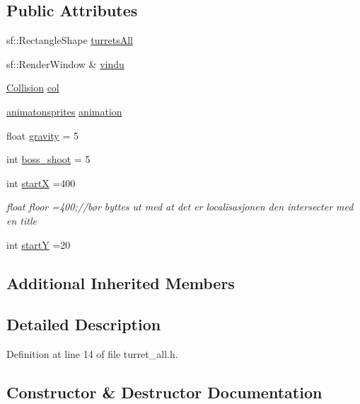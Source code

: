 \subsection*{Public Attributes}
\begin{DoxyCompactItemize}
\item 
sf\+::\+Rectangle\+Shape \hyperlink{classturret__all_a63e89be682fc405614dcd683b4771459}{turrets\+All}
\item 
sf\+::\+Render\+Window \& \hyperlink{classturret__all_a7a5259aab37af1c5398ba52708261bf4}{vindu}
\item 
\hyperlink{class_collision}{Collision} \hyperlink{classturret__all_af94d8c16e0c4896dfc229e0f6dee32c2}{col}
\item 
\hyperlink{classanimatonsprites}{animatonsprites} \hyperlink{classturret__all_a01784564dae9cc3e0ab320f1fa02f387}{animation}
\item 
float \hyperlink{classturret__all_a8d25c14dd820c6725616fa8eb7978cc8}{gravity} = 5
\item 
int \hyperlink{classturret__all_a5ea63184c3e11cdfa233f99f3aaadd69}{boss\+\_\+shoot} = 5
\item 
int \hyperlink{classturret__all_a18ee683d7bedabba67601c9450082ea2}{startX} =400
\begin{DoxyCompactList}\small\item\em float floor =400;//bør byttes ut med at det er localisasjonen den intersecter med en title \end{DoxyCompactList}\item 
int \hyperlink{classturret__all_a31a66435d667c04c7fa3d72be64c1630}{startY} =20
\end{DoxyCompactItemize}
\subsection*{Additional Inherited Members}


\subsection{Detailed Description}


Definition at line 14 of file turret\+\_\+all.\+h.



\subsection{Constructor \& Destructor Documentation}
\hypertarget{classturret__all_a9d5e677783bb0f86ae51cf9f8a4f7990}{}\label{classturret__all_a9d5e677783bb0f86ae51cf9f8a4f7990} 
